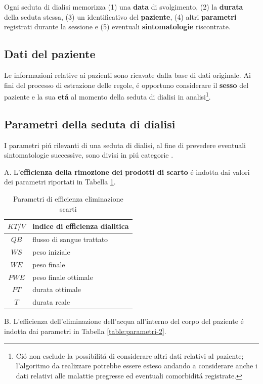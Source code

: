 \documentclass[preprint]{acm_proc_article-sp}
\begin{document}
Ogni seduta di dialisi memorizza (1) una \textbf{data} di svolgimento, (2) la \textbf{durata} della seduta stessa, (3) un identificativo del \textbf{paziente}, (4) altri \textbf{parametri} registrati durante la sessione e (5) eventuali \textbf{sintomatologie} riscontrate.

\subsection{Dati del paziente}
Le informazioni relative ai pazienti sono ricavate dalla base di dati originale. Ai fini del processo di estrazione delle regole, \'e opportuno considerare il \textbf{sesso} del paziente e la sua \textbf{et\'a} al momento della seduta di dialisi in analisi\footnote{Ci\'o non esclude la possibilit\'a di considerare altri dati relativi al paziente; l'algoritmo da realizzare potrebbe essere esteso andando a considerare anche i dati relativi alle malattie pregresse ed eventuali comorbidit\'a registrate.}.

\subsection{Parametri della seduta di dialisi}
I parametri pi\'u rilevanti di una seduta di dialisi, al fine di prevedere eventuali sintomatologie successive, sono divisi in pi\'u categorie \cite{bellazziintelligent}  \cite{pmid15749092}.

A. L'\textbf{efficienza della rimozione dei prodotti di scarto} \'e indotta dai valori dei parametri riportati in Tabella \ref{table:parametri-1}.

\begin{table}[h]
\centering
\begin{tabular}{|c|l|} \hline
$KT/V$ & indice di efficienza dialitica\\ \hline
$QB$ & flusso di sangue trattato\\ \hline
$WS$ & peso iniziale \\ \hline
$WE$ & peso finale \\ \hline
$PWE$ & peso finale ottimale \\ \hline
$PT$ & durata ottimale \\ \hline
$T$ & durata reale \\
\hline\end{tabular}
\caption{Parametri di efficienza eliminazione scarti}
\label{table:parametri-1}
\end{table}

B. L'efficienza dell'eliminazione dell'acqua all'interno del corpo del paziente \'e indotta dai parametri in Tabella \ref{table:parametri-2}.
\end{document}
